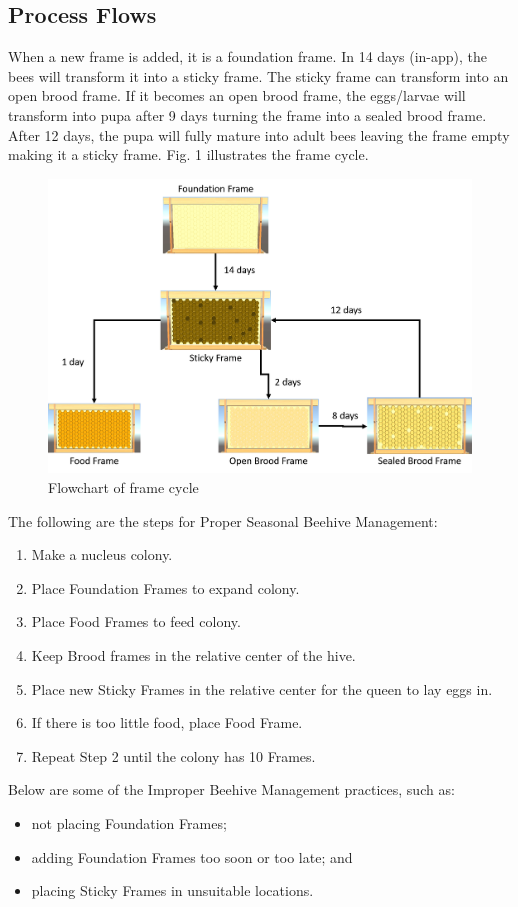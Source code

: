 \documentclass[journal]{./IEEE/IEEEtran}
\begin{document}
\subsection{Process Flows}
When a new frame is added, it is a foundation frame. In 14 days (in-app), the bees will transform it into a sticky frame. The sticky frame can transform into an open brood frame. If it becomes an open brood frame, the eggs/larvae will transform into pupa after 9 days turning the frame into a sealed brood frame. After 12 days, the pupa will fully mature into adult bees leaving the frame empty making it a sticky frame. Fig. 1 illustrates the frame cycle.
\begin{figure}[H]
\includegraphics[scale=0.3]{./images/frame-cycle.png}
\centering
\caption{Flowchart of frame cycle}
\end{figure}
\indent

The following are the steps for Proper Seasonal Beehive Management:
\begin{enumerate}
    \item Make a nucleus colony.
    \item Place Foundation Frames to expand colony.
    \item Place Food Frames to feed colony.
    \item Keep Brood frames in the relative center of the hive.
    \item Place new Sticky Frames in the relative center for the queen to lay eggs in.
    \item If there is too little food, place Food Frame.
    \item Repeat Step 2 until the colony has 10 Frames.
\end{enumerate}
\indent Below are some of the Improper Beehive Management practices, such as:
\begin{itemize}
    \item not placing Foundation Frames;
    \item adding Foundation Frames too soon or too late; and
    \item placing Sticky Frames in unsuitable locations.
\end{itemize}
\end{document}
